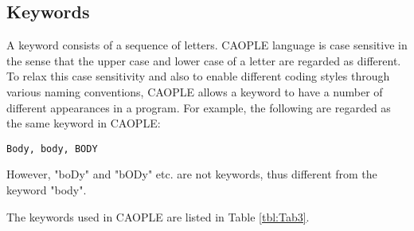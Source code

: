 \documentclass[english]{report}
\begin{document}
\subsection{Keywords}\label{sect:keywords}

A keyword consists of a sequence of letters. CAOPLE language is case sensitive in the sense that the upper case and lower case of a letter are regarded as different. To relax this case sensitivity and also to enable different coding styles through various naming conventions, CAOPLE allows a keyword to have a number of different appearances in a program.  For example, the following are regarded as the same keyword in CAOPLE:
\begin{center}
\texttt{Body, body, BODY}
\end{center}

However, "boDy" and "bODy" etc. are not keywords, thus different from the keyword "body". 

The keywords used in CAOPLE are listed in Table \ref{tbl:Tab3}. 
\end{document}

